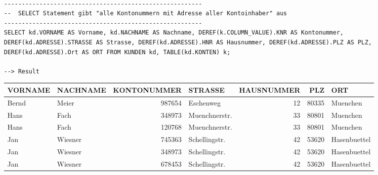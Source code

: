 \documentclass{scrartcl}
\begin{document}
\begin{landscape}
\begin{lstlisting}

--------------------------------------------------------
--  SELECT Statement gibt "alle Kontonummern mit Adresse aller Kontoinhaber" aus
--------------------------------------------------------
SELECT kd.VORNAME AS Vorname, kd.NACHNAME AS Nachname, DEREF(k.COLUMN_VALUE).KNR AS Kontonummer, DEREF(kd.ADRESSE).STRASSE AS Strasse, DEREF(kd.ADRESSE).HNR AS Hausnummer, DEREF(kd.ADRESSE).PLZ AS PLZ, DEREF(kd.ADRESSE).Ort AS ORT FROM KUNDEN kd, TABLE(kd.KONTEN) k;

--> Result
\end{lstlisting}

\begin{tabular}{ l l r l r r l }
VORNAME& NACHNAME &  KONTONUMMER  & STRASSE   &   HAUSNUMMER&  PLZ & ORT \\           
\hline
Bernd &  Meier &  987654& Eschenweg    & 12   &   80335 & Muenchen \\              
Hans &   Fach  &  348973& Muenchnerstr. & 33  &    80801&  Muenchen  \\            
Hans  &  Fach  &  120768& Muenchnerstr.& 33   &   80801 & Muenchen     \\         
Jan  &   Wiesner& 745363& Schellingstr.& 42    &  53620& Hasenbuettel   \\       
Jan  &   Wiesner& 348973& Schellingstr.& 42   &   53620& Hasenbuettel     \\     
Jan   &  Wiesner& 678453& Schellingstr. & 42  &    53620 & Hasenbuettel \\
\end{tabular}
\end{landscape}

\newpage
\end{document}
